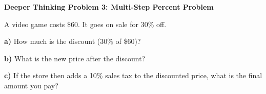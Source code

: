 \documentclass[12pt, letterpaper, fleqn]{article}
\begin{document}
\newpage

\begin{tcolorbox}[colback=yellow!15, colframe=orange, boxrule=1.5pt, arc=4mm, left=6mm, right=6mm, top=5mm, bottom=5mm]

\textbf{Deeper Thinking Problem 3: Multi-Step Percent Problem}

\medskip

\noindent
A video game costs \$60. It goes on sale for 30\% off.

\noindent
\textbf{a)} How much is the discount (30\% of \$60)?

\vspace{1.8cm}

\noindent
\textbf{b)} What is the new price after the discount?

\vspace{1.8cm}

\noindent
\textbf{c)} If the store then adds a 10\% sales tax to the discounted price, what is the final amount you pay?

\vspace{2cm}

\end{tcolorbox}
\end{document}
